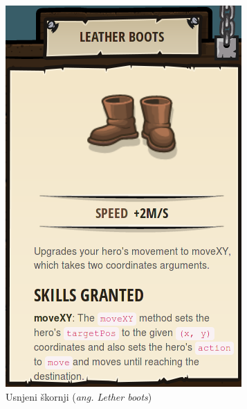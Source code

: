 \begin{figure}[h!]
\begin{subfigure}[]{0.25\textwidth}
        \includegraphics[width=\textwidth]{./images/sc_web/cc_EQ-LB-v01.png}
        \caption{Usnjeni škornji (\emph{ang. Lether boots})}
        \label{fig:cc:eq:lb}
    \end{subfigure}
    \\
    \begin{subfigure}[]{0.25\textwidth}

\end{subfigure}
\end{figure}
